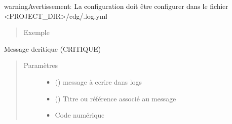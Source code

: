 \documentclass[letterpaper,10pt,french]{sphinxmanual}
\begin{document}
\begin{fulllineitems}
\begin{fulllineitems}
\begin{sphinxadmonition}{warning}{Avertissement:}
La configuration doit être configurer dans le fichier \textless{}PROJECT\_DIR\textgreater{}/cdg/.log.yml
\end{sphinxadmonition}
\begin{quote}\begin{description}
\item[{Exemple}] \leavevmode
\begin{sphinxVerbatim}[commandchars=\\\{\}]
\end{sphinxVerbatim}

\end{description}\end{quote}

\end{fulllineitems}


\begin{fulllineitems}
\label{\detokenize{classes/cfgloader:toolbox.logmng.CTracker.critical_tracking}}
Message dcritique (CRITIQUE)
\begin{quote}\begin{description}
\item[{Paramètres}] \leavevmode\begin{itemize}
\item {} 
 () \textendash{} message à ecrire dans logs

\item {} 
 () \textendash{} Titre ou référence associé au message

\item {} 
 \textendash{} Code numérique


\end{itemize}
\end{description}
\end{quote}
\end{fulllineitems}
\end{fulllineitems}
\end{document}
